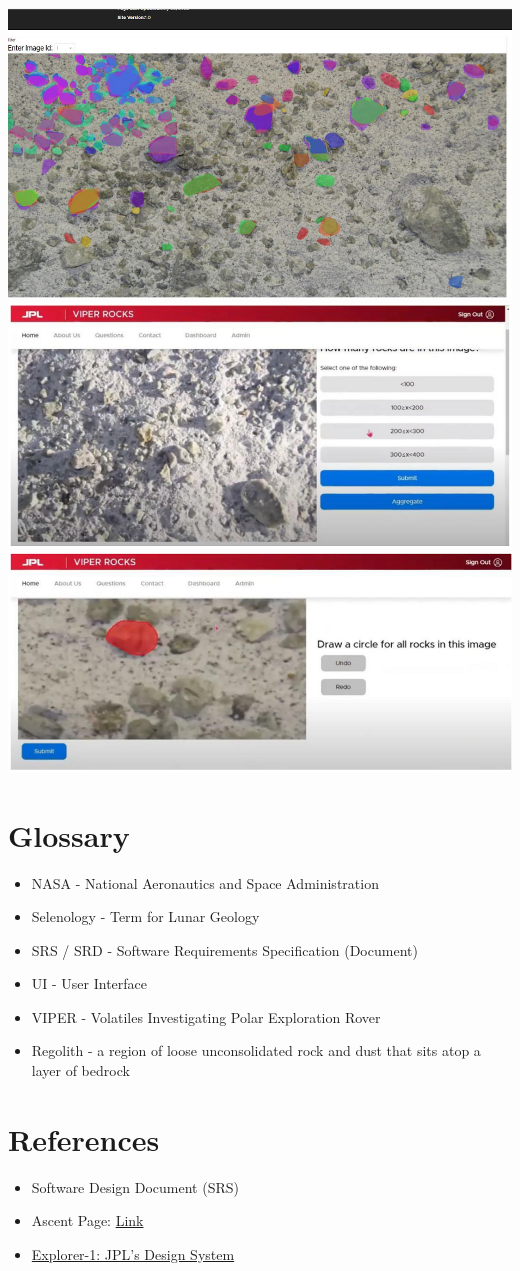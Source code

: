 \documentclass{article}
\begin{document}
\includegraphics{scouting_page}
\includegraphics{scouting_page_2}
\includegraphics{sizing_page}
\section{Glossary}
\begin{itemize}
	\item NASA - National Aeronautics and Space Administration
	\item Selenology - Term for Lunar Geology
	\item SRS / SRD - Software Requirements Specification (Document)
	\item UI - User Interface
	\item VIPER - Volatiles Investigating Polar Exploration Rover
	\item Regolith - a region of loose unconsolidated rock and dust that sits atop a layer of bedrock
\end{itemize}

\section{References}
\begin{itemize}
	\item Software Design Document (SRS)
	\item Ascent Page: \href{https://ascent.cysun.org/project/project/view/227}{Link}
	\item \href{https://github.com/nasa-jpl/explorer-1}{Explorer-1: JPL's Design System}
\end{itemize}
\end{document}
